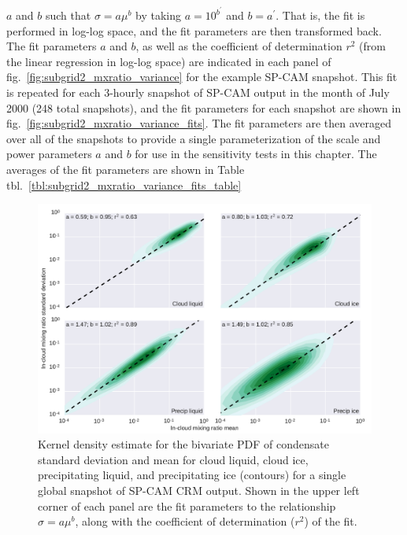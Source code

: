 \(a\) and \(b\) such that \(\sigma = a \mu^b\) by taking
\(a = 10^{b^{\prime}}\) and \(b = a^{\prime}\). That is, the fit is
performed in log-log space, and the fit parameters are then transformed
back. The fit parameters \(a\) and \(b\), as well as the coefficient of
determination \(r^2\) (from the linear regression in log-log space) are
indicated in each panel of fig.~\ref{fig:subgrid2_mxratio_variance} for
the example SP-CAM snapshot. This fit is repeated for each 3-hourly
snapshot of SP-CAM output in the month of July 2000 (248 total
snapshots), and the fit parameters for each snapshot are shown in
fig.~\ref{fig:subgrid2_mxratio_variance_fits}. The fit parameters are
then averaged over all of the snapshots to provide a single
parameterization of the scale and power parameters \(a\) and \(b\) for
use in the sensitivity tests in this chapter. The averages of the fit
parameters are shown in Table
tbl.~\ref{tbl:subgrid2_mxratio_variance_fits_table}

\begin{figure}[htbp]
\centering
\includegraphics{graphics/subgrid2_mxratio_variance.pdf}
\caption{\label{fig:subgrid2_mxratio_variance}Kernel density estimate
for the bivariate PDF of condensate standard deviation and mean for
cloud liquid, cloud ice, precipitating liquid, and precipitating ice
(contours) for a single global snapshot of SP-CAM CRM output. Shown in
the upper left corner of each panel are the fit parameters to the
relationship \(\sigma = a \mu^b\), along with the coefficient of
determination (\(r^2\)) of the
fit.}\label{fig:subgrid2ux5fmxratioux5fvariance}
\end{figure}

